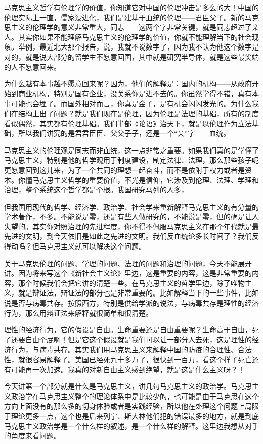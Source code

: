 \documentclass[UTF8, 12pt, a4paper]{ctexrep}
\begin{document}
马克思主义哲学有伦理学的价值，你知道它对中国的伦理冲击是多么的大！中国的伦理实际上一直，儒家没进化，我们是建基于血统的伦理——君臣父子。新的马克思主义的伦理学的意义非常重大，同志——这两个字非常关键，就是同志超过了亲人。其实你如果不能理解马克思主义的伦理学的价值，你就不能理解当下的社会现象。举例，最近北大那个报告，说，我就不说数字了，因为我不认为他这个数字是对的，就是说大部分的留学生不愿意回国，其中就是研究半导体，就是这些最尖端的人不愿意回来。

为什么越有本事越不愿意回来呢？因为，他们的解释是：国内的机构——从政府开始到商业机构，特别是国有企业，没关系你是进不去的。你虽然学得不错，真有本事可能也会埋了。而国外相对而言，你真是金子，是有机会闪闪发光的。为什么我们在结构上出了问题？就是我们现在是伦理，因为伦理是法理的基础，所有的制度看似偶然，其实都有伦理基础。我们半部《论语》治天下，就是以伦理作为立法基础，所以我们讲究的是君君臣臣、父父子子，还是一个“亲”字——血统。

马克思主义的伦理观是同志而非血统，这一点非常之重要。如果我们真的是学懂了马克思主义，特别是他的哲学观用于制度建设，制定法律、法理，那么那些孩子呢更愿意回到这儿来，为了一个共同的理想一起奋斗，而不是依附于权力或者是资本。你懂马克思主义哲学的重要价值，不光是信仰，它涉及到伦理、法理、学理和治理，整个系统这个哲学都是个根。我国研究马列的人多，

但我国用现代的哲学、经济学、政治学、社会学来重新解释马克思主义的有分量的学术著作，不多。不能说是零，还是有些人做研究的，不能说是零，但的确是让人失望的。其实你对照治理的先进程度，你不得不佩服马克思主义在那个年代就是最先进的文明，到今天依旧是如此之先进的文明。我们反血统论多长时间了？我们反得动吗？但马克思主义就可以解决这个问题。

关于马克思伦理的问题、学理的问题、法理的问题和治理的问题，今天不能展开讲。因为将来写这个《新社会主义论》里边，这是重要的内容，这是非常重要的内容，那个时候我们会把它讲的清楚一些。在马克思主义的哲学里边，除了唯物主义，就是辩证法，辩证法的部分也是非常重要的。比如解释当下的一些事件，比如说是否与病毒共存。按照西方，特别是供给学派的说法，与病毒共存是理性的经济行为，那么用辩证法来解释就很简单和很清楚。

理性的经济行为，它的假设是自由。生命重要还是自由重要呢？生命高于自由，死了还要自由个屁啊！但是它这个假设就是我们可以让一部分人去死，这是理性的经济行为，与病毒共存。其实我们用马克思主义来解释中国的防疫的合理性、合法性，就很容易解释了。美国已经死九十多万了，很快到一百万，看这个样子死亡还有可能再一次加速。我真的对新自由主义感到绝望，就是这是什么主义呀？！

今天讲第一个部分就是什么是马克思主义，讲几句马克思主义的政治学。马克思主义政治学在马克思主义整个的理论体系中是比较少的，也可能是由于马克思在这个方向上面没有的那么多的切身体验或者是实践经验，所以他在处理这个问题上局限于理论更多一点，这个也是后来列宁、斯大林他们犯的错误最多的地方，就是到底马克思主义政治学是一个什么样的叙述，是一个什么样的解释。这里边我想从对手的角度来看问题。
\end{document}
